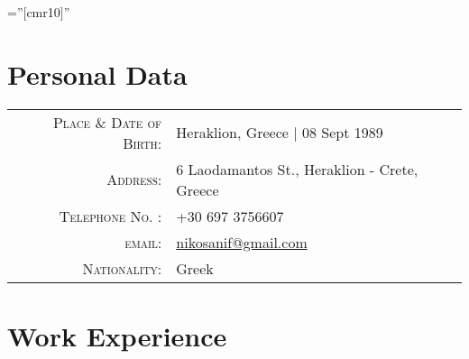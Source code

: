 \documentclass[11pt]{article}
\begin{document}

\font\fb=''[cmr10]'' 

\par{\par}
\par{\par}
\bigskip

\section{Personal Data}

\begin{tabular}{rl}
    \textsc{Place \& Date of Birth:}    & Heraklion, Greece | 08 Sept 1989 \\
    \textsc{Address:}                   & 6 Laodamantos St., Heraklion - Crete, Greece \\
    \textsc{Telephone No. :}            & +30 697 3756607 \\
    \textsc{email:}                     & \href{mailto:nikosanif@gmail.com}{nikosanif@gmail.com} \\
    \textsc{Nationality:}               & Greek \\
\end{tabular}

\section{Work Experience}
\end{document}
